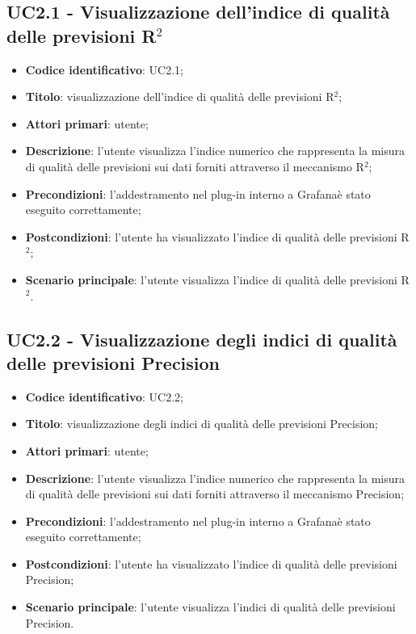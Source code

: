 \subsection{UC2.1 - Visualizzazione dell'indice di qualità delle previsioni R$^{2}$}
\begin{itemize}
	\item \textbf{Codice identificativo}: UC2.1;
	\item \textbf{Titolo}: visualizzazione dell'indice di qualità delle previsioni R$^{2}$\glo;
	\item \textbf{Attori primari}: utente;
	\item \textbf{Descrizione}: l'utente visualizza l'indice numerico che rappresenta la misura di qualità delle previsioni sui dati forniti attraverso il meccanismo R$^{2}$\glo;
	\item \textbf{Precondizioni}: l'addestramento nel plug-in interno a Grafana\glosp è stato eseguito correttamente;
	\item \textbf{Postcondizioni}: l'utente ha visualizzato l'indice di qualità delle previsioni R$^{2}$\glo;
	\item \textbf{Scenario principale}: l'utente visualizza l'indice di qualità delle previsioni R$^{2}$\glo.
\end{itemize} 
\subsection{UC2.2 - Visualizzazione degli indici di qualità delle previsioni Precision}
\begin{itemize}
	\item \textbf{Codice identificativo}: UC2.2;
	\item \textbf{Titolo}: visualizzazione degli indici di qualità delle previsioni Precision\glo;
	\item \textbf{Attori primari}: utente;
	\item \textbf{Descrizione}: l'utente visualizza l'indice numerico che rappresenta la misura di qualità delle previsioni sui dati forniti attraverso il meccanismo Precision\glo;
	\item \textbf{Precondizioni}: l'addestramento nel plug-in interno a Grafana\glosp è stato eseguito correttamente;
	\item \textbf{Postcondizioni}: l'utente ha visualizzato l'indice di qualità delle previsioni Precision\glo;
	\item \textbf{Scenario principale}: l'utente visualizza l'indici di qualità delle previsioni Precision\glo.
\end{itemize} 
